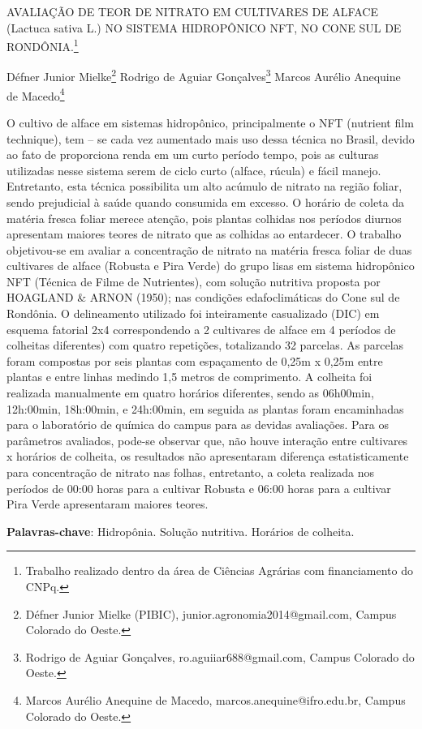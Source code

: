 \documentclass[article,12pt,onesidea,4paper,english,brazil]{abntex2}
\begin{document}
	
	
	\frenchspacing 
	
	\begin{center}
		\LARGE AVALIAÇÃO DE TEOR DE NITRATO EM CULTIVARES DE ALFACE (Lactuca sativa L.) NO SISTEMA HIDROPÔNICO NFT, NO CONE SUL DE RONDÔNIA.\footnote{Trabalho realizado dentro da área de Ciências Agrárias com financiamento do CNPq.}
		
		\normalsize
	Défner Junior Mielke\footnote{Défner Junior Mielke (PIBIC), junior.agronomia2014@gmail.com, Campus Colorado do Oeste.} 
		Rodrigo de Aguiar Gonçalves\footnote{Rodrigo de Aguiar Gonçalves, ro.aguiiar688@gmail.com, Campus Colorado do Oeste.} 
		Marcos Aurélio Anequine de Macedo\footnote{Marcos Aurélio Anequine de Macedo, marcos.anequine@ifro.edu.br, Campus Colorado do Oeste.} 
	\end{center}
	
	\noindent O cultivo de alface em sistemas hidropônico, principalmente o NFT (nutrient film technique), tem – se cada vez aumentado mais uso dessa técnica no Brasil, devido ao fato de proporciona renda em um curto período tempo, pois as culturas utilizadas nesse sistema serem de ciclo curto (alface, rúcula) e fácil manejo. Entretanto, esta técnica possibilita um alto acúmulo de nitrato na região foliar, sendo prejudicial à saúde quando consumida em excesso. O horário de coleta da matéria fresca foliar merece atenção, pois plantas colhidas nos períodos diurnos apresentam maiores teores de nitrato que as colhidas ao entardecer. O trabalho objetivou-se em avaliar a concentração de nitrato na matéria fresca foliar de duas cultivares de alface (Robusta e Pira Verde) do grupo lisas em sistema hidropônico NFT (Técnica de Filme de Nutrientes), com solução nutritiva proposta por HOAGLAND \& ARNON (1950); nas condições edafoclimáticas do Cone sul de Rondônia. O delineamento utilizado foi inteiramente casualizado (DIC) em esquema fatorial 2x4 correspondendo a 2 cultivares de alface em 4 períodos de colheitas diferentes) com quatro repetições, totalizando 32 parcelas. As parcelas foram compostas por seis plantas com espaçamento de 0,25m x 0,25m entre plantas e entre linhas medindo 1,5 metros de comprimento. A colheita foi realizada manualmente em quatro horários diferentes, sendo as 06h00min, 12h:00min, 18h:00min, e 24h:00min, em seguida as plantas foram encaminhadas para o laboratório de química do campus para as devidas avaliações. Para os parâmetros avaliados, pode-se observar que, não houve interação entre cultivares x horários de colheita, os resultados não apresentaram diferença estatisticamente para concentração de nitrato nas folhas, entretanto, a coleta realizada nos períodos de 00:00 horas para a cultivar Robusta e 06:00 horas para a cultivar Pira Verde apresentaram maiores teores.
	
	\vspace{\onelineskip}
	
	\noindent
	\textbf{Palavras-chave}: Hidropônia. Solução nutritiva. Horários de colheita.
	
\end{document}
